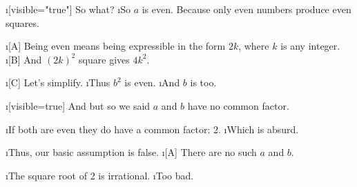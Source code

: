 \i[visible="true"] So what?
\i So $a$ is even. Because only even numbers produce even squares.

\i[A] Being even means being expressible in the form $2k$, where $k$ is
any integer.
\i[B] And $(2k)^2$ square gives $4k^2$.

\i[C] Let's simplify.
\i Thus $b^2$ is even.
\i And $b$ is too.

\endslide





\i[visible=true] And but so we said $a$ and $b$ have no common factor.

\i If both are even they do have a common factor: 2.
\i Which is absurd.

\i Thus, our basic assumption is false.
\i[A] There are no such $a$ and $b$.

\i The square root of 2 is irrational.
\i Too bad.

\endslide



\bye



